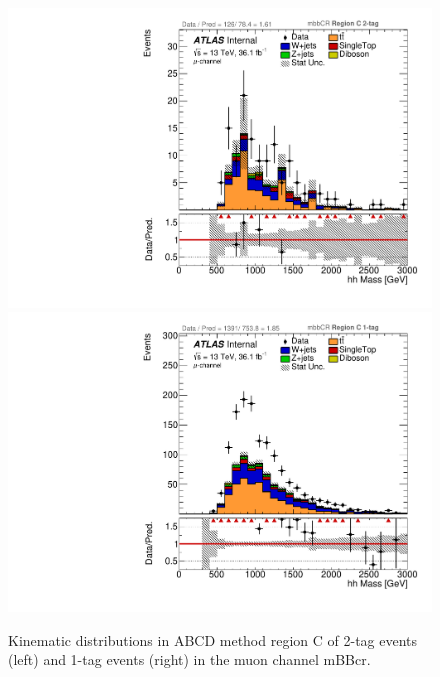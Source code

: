 \begin{figure}[!htbp]
\begin{center}
\includegraphics[scale=0.23]{./figures/boosted/ABCD/muon_mbbcr_RegionC_hhMass}
\includegraphics[scale=0.23]{./figures/boosted/ABCD/muon_mbbcr_RegionC_1tag_hhMass}
\caption{Kinematic distributions in ABCD method region C of 2-tag events (left) and 1-tag events (right) in the muon channel mBBcr.}
\label{fig:boosted_abcd_region_c_mbbcr_muon}
\end{center}
\end{figure}

